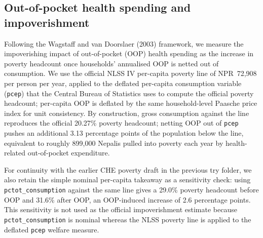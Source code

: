 %
%


\subsection*{Out-of-pocket health spending and impoverishment}

Following the Wagstaff and van Doorslaer (2003) framework, we measure the
impoverishing impact of out-of-pocket (OOP) health spending as the increase
in poverty headcount once households' annualised OOP is netted out of
consumption. We use the official NLSS IV per-capita poverty line of
NPR~72{,}908 per person per year, applied to the deflated per-capita
consumption variable (\texttt{pcep}) that the Central Bureau of Statistics
uses to compute the official poverty headcount; per-capita OOP is deflated
by the same household-level Paasche price index for unit consistency. By
construction, gross consumption against the line reproduces the official
20.27\% poverty headcount; netting OOP out of \texttt{pcep} pushes an
additional 3.13 percentage points of the population below the line, equivalent
to roughly 899{,}000 Nepalis pulled into poverty each year by health-related
out-of-pocket expenditure.

For continuity with the earlier CHE poverty draft in the previous try folder,
we also retain the simple nominal per-capita takeaway as a sensitivity check:
using \texttt{pctot\_consumption} against the same line gives a 29.0\%
poverty headcount before OOP and 31.6\% after OOP, an OOP-induced increase of
2.6 percentage points. This sensitivity is not used as the official
impoverishment estimate because \texttt{pctot\_consumption} is nominal whereas
the NLSS poverty line is applied to the deflated \texttt{pcep} welfare measure.

